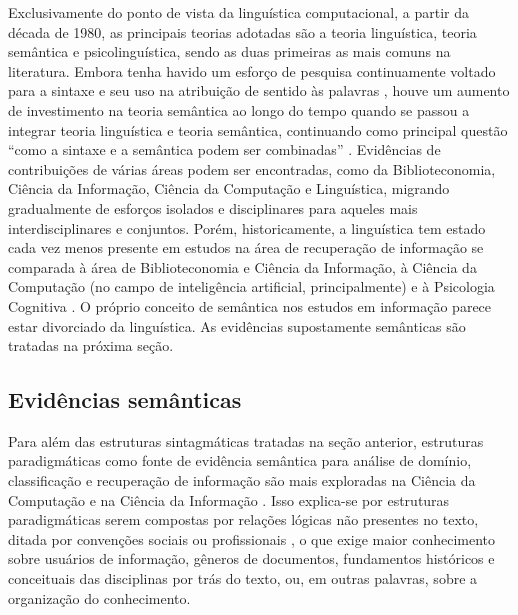 Exclusivamente do ponto de vista da linguística computacional, a partir da década de 1980, as principais teorias adotadas são a teoria linguística, teoria semântica e psicolinguística, sendo as duas primeiras as mais comuns na literatura. Embora tenha havido um esforço de pesquisa continuamente voltado para a sintaxe e seu uso na atribuição de sentido às palavras \cite{navigli09wordsense}, houve um aumento de investimento na teoria semântica ao longo do tempo quando se passou a integrar teoria linguística e teoria semântica, continuando como principal questão ``como a sintaxe e a semântica podem ser combinadas'' \cite[p. 50]{ladeira10}. Evidências de contribuições de várias áreas podem ser encontradas, como da Biblioteconomia, Ciência da Informação, Ciência da Computação e Linguística, migrando gradualmente de esforços isolados e disciplinares para aqueles mais interdisciplinares e conjuntos. Porém, historicamente, a linguística tem estado cada vez menos presente em estudos na área de recuperação de informação se comparada à área de Biblioteconomia e Ciência da Informação, à Ciência da Computação (no campo de inteligência artificial, principalmente) e à Psicologia Cognitiva \cite{gardin1973,ladeira10}. O próprio conceito de semântica nos estudos em informação parece estar divorciado da linguística. As evidências supostamente semânticas são tratadas na próxima seção.




\subsection{Evidências semânticas}%

Para além das estruturas sintagmáticas tratadas na seção anterior, estruturas paradigmáticas como fonte de evidência semântica para análise de domínio, classificação e recuperação de informação são mais exploradas na Ciência da Computação e na Ciência da Informação \cite{ladeira10}. Isso explica-se por estruturas paradigmáticas serem compostas por relações lógicas não presentes no texto, ditada por convenções sociais ou profissionais \cite[p. 147]{gardin1973}, o que exige maior conhecimento sobre usuários de informação, gêneros de documentos, fundamentos históricos e conceituais das disciplinas por trás do texto, ou, em outras palavras, sobre a organização do conhecimento. 

